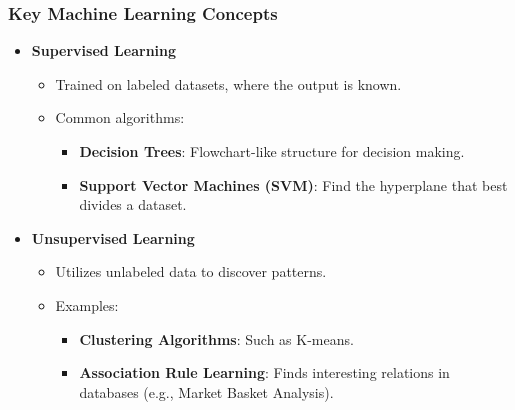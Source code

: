 \documentclass{beamer}
\begin{document}
\begin{frame}[fragile]
    \frametitle{Key Machine Learning Concepts}
    \begin{itemize}
        \item \textbf{Supervised Learning}
            \begin{itemize}
                \item Trained on labeled datasets, where the output is known.
                \item Common algorithms:
                    \begin{itemize}
                        \item \textbf{Decision Trees}: Flowchart-like structure for decision making.
                        \item \textbf{Support Vector Machines (SVM)}: Find the hyperplane that best divides a dataset.
                    \end{itemize}
            \end{itemize}
        \item \textbf{Unsupervised Learning}
            \begin{itemize}
                \item Utilizes unlabeled data to discover patterns.
                \item Examples:
                    \begin{itemize}
                        \item \textbf{Clustering Algorithms}: Such as K-means.
                        \item \textbf{Association Rule Learning}: Finds interesting relations in databases (e.g., Market Basket Analysis).
                    \end{itemize}
            \end{itemize}
    \end{itemize}
\end{frame}
\end{document}
